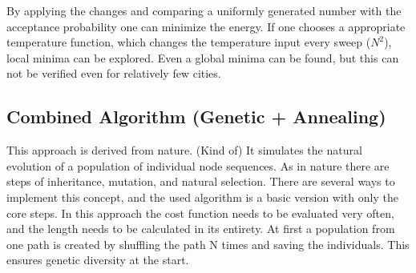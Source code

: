 \noindent By applying the changes and comparing a uniformly generated number with the acceptance probability one can minimize the energy.
If one chooses a appropriate temperature function, which changes the temperature input every sweep ($N^2$), local minima can be explored. 
Even a global minima can be found, but this can not be verified even for relatively few cities.

\subsection{Combined Algorithm (Genetic + Annealing)}
This approach is derived from nature. (Kind of) 
It simulates the natural evolution of a population of individual node sequences.
As in nature there are steps of inheritance, mutation, and natural selection. 
There are several ways to implement this concept, and the used algorithm is a basic version with only the core steps.
In this approach the cost function needs to be evaluated very often, and the length needs to be calculated in its entirety.
At first a population from one path is created by shuffling the path N times and saving the individuals.
This ensures genetic diversity at the start.

